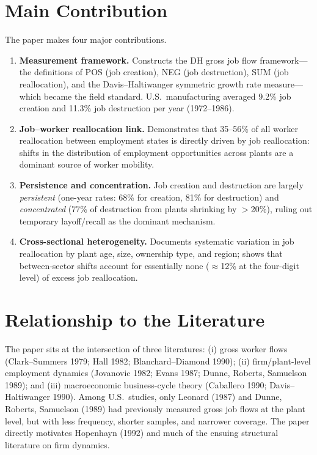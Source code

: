 \section{Main Contribution}

The paper makes four major contributions.

\begin{enumerate}
  \item \textbf{Measurement framework.} Constructs the DH gross job flow
    framework---the definitions of POS (job creation), NEG (job destruction),
    SUM (job reallocation), and the Davis--Haltiwanger symmetric growth rate
    measure---which became the field standard. U.S.\ manufacturing averaged
    9.2\% job creation and 11.3\% job destruction per year (1972--1986).

  \item \textbf{Job--worker reallocation link.} Demonstrates that
    35--56\% of all worker reallocation between employment states is directly
    driven by job reallocation: shifts in the distribution of employment
    opportunities across plants are a dominant source of worker mobility.

  \item \textbf{Persistence and concentration.} Job creation and destruction
    are largely \emph{persistent} (one-year rates: 68\% for creation, 81\%
    for destruction) and \emph{concentrated} (77\% of destruction from plants
    shrinking by $>$20\%), ruling out temporary layoff/recall as the dominant
    mechanism.

  \item \textbf{Cross-sectional heterogeneity.} Documents systematic
    variation in job reallocation by plant age, size, ownership type, and
    region; shows that between-sector shifts account for essentially none
    ($\approx$12\% at the four-digit level) of excess job reallocation.
\end{enumerate}

\section{Relationship to the Literature}

The paper sits at the intersection of three literatures: (i) gross worker
flows (Clark--Summers 1979; Hall 1982; Blanchard--Diamond 1990); (ii)
firm/plant-level employment dynamics (Jovanovic 1982; Evans 1987; Dunne,
Roberts, Samuelson 1989); and (iii) macroeconomic business-cycle theory
(Caballero 1990; Davis--Haltiwanger 1990). Among U.S.\ studies, only Leonard
(1987) and Dunne, Roberts, Samuelson (1989) had previously measured gross job
flows at the plant level, but with less frequency, shorter samples, and
narrower coverage. The paper directly motivates Hopenhayn (1992) and much of
the ensuing structural literature on firm dynamics.

